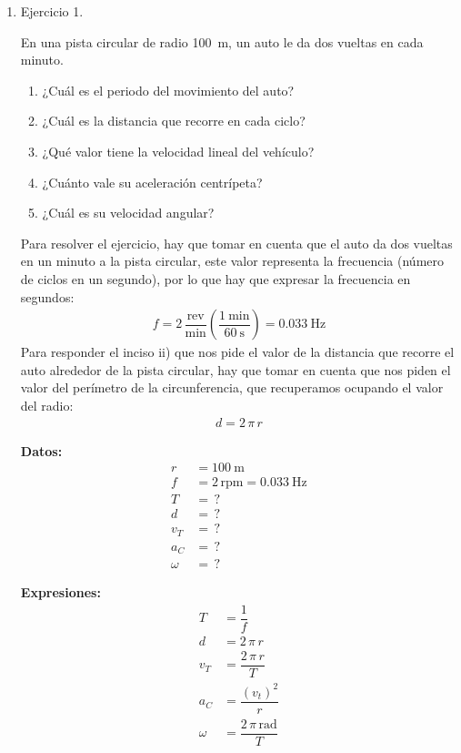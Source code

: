 \documentclass[12pt]{article}
\begin{document}
\begin{enumerate}
\item Ejercicio 1.

En una pista circular de radio \SI{100}{\meter}, un auto le da dos vueltas en cada minuto.
\begin{enumerate}[label=\roman*)]
\item ¿Cuál es el periodo del movimiento del auto?
\item ¿Cuál es la distancia que recorre en cada ciclo?
\item ¿Qué valor tiene la velocidad lineal del vehículo?
\item ¿Cuánto vale su aceleración centrípeta?
\item ¿Cuál es su velocidad angular?
\end{enumerate}

Para resolver el ejercicio, hay que tomar en cuenta que el auto da dos vueltas en un minuto a la pista circular, este valor representa la frecuencia (número de ciclos en un segundo), por lo que hay que expresar la frecuencia en segundos:
\begin{align*}
f = 2 \, \dfrac{\text{rev}}{\unit{\minute}} \left( \dfrac{\SI{1}{\minute}}{\SI{60}{\second}} \right) = \SI{0.033}{\hertz}
\end{align*}
Para responder el inciso ii) que nos pide el valor de la distancia que recorre el auto alrededor de la pista circular, hay que tomar en cuenta que nos piden el valor del perímetro de la circunferencia, que recuperamos ocupando el valor del radio:
\begin{align*}
d = 2 \, \pi \, r
\end{align*}
\vspace*{0.5cm}
\begin{minipage}[t]{0.4\linewidth}
\textbf{Datos:}
\begin{align*}
r &= \SI{100}{\meter} \\
f &= 2 \, \text{rpm} = \SI{0.033}{\hertz} \\
T &= \, ? \\
d &= \, ? \\
v_{T} &= \, ? \\
a_{C} &= \, ? \\
\omega &= \, ?
\end{align*}
\end{minipage}
\begin{minipage}[t]{0.4\linewidth}
\textbf{Expresiones:}
\begin{align*}
T &= \dfrac{1}{f} \\
d &= 2 \, \pi \,  r \\
v_{T} &= \dfrac{2 \, \pi \, r }{T} \\
a_{C} &= \dfrac{(v_{t})^{2}}{r} \\
\omega &= \dfrac{2 \, \pi \, \unit{\radian}}{T}
\end{align*}
\end{minipage}


\end{enumerate}
\end{document}

